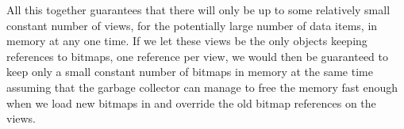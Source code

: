 All this together guarantees that there will only be up to some relatively small constant number of views, for the potentially large number of data items, in memory at any one time. If we let these views be the only objects keeping references to bitmaps, one reference per view, we would then be guaranteed to keep only a small constant number of bitmaps in memory at the same time assuming that the garbage collector can manage to free the memory fast enough when we load new bitmaps in and override the old bitmap references on the views. 
